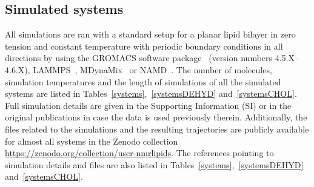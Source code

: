 \documentclass[journal=jacsat,manuscript=article]{achemso}
\begin{document}
\subsection{Simulated systems}
All simulations are ran with a standard setup for a planar lipid bilayer in zero tension and constant temperature
with periodic boundary conditions in all directions by using the GROMACS software package~\cite{hess08} 
(version numbers 4.5.X--4.6.X), LAMMPS~\cite{plimpton95}, MDynaMix~\cite{Lyubartsev00} or NAMD~\cite{phillips05}.
The number of molecules, simulation temperatures and the length of simulations of all the simulated systems 
are listed in Tables~\ref{systems},~\ref{systemsDEHYD} and~\ref{systemsCHOL}. Full simulation
details are given in the Supporting Information (SI) or in the original publications in case the
data is used previously therein. Additionally, the files related to the simulations and the resulting trajectories are publicly
available for almost all systems in the Zenodo collection \url{https://zenodo.org/collection/user-nmrlipids}. 
The references pointing to simulation details and files are also listed in Tables~\ref{systems},~\ref{systemsDEHYD} and~\ref{systemsCHOL}.
\end{document}
